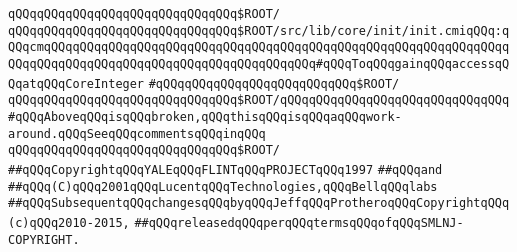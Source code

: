 \verb|qQQqqQQqqQQqqQQqqQQqqQQqqQQqqQQq$ROOT/|\newline
\newline
\verb|qQQqqQQqqQQqqQQqqQQqqQQqqQQqqQQq$ROOT/src/lib/core/init/init.cmiqQQq:qQQqcmqQQqqQQqqQQqqQQqqQQqqQQqqQQqqQQqqQQqqQQqqQQqqQQqqQQqqQQqqQQqqQQqqQQqqQQqqQQqqQQqqQQqqQQqqQQqqQQqqQQqqQQqqQQq#qQQqToqQQqgainqQQqaccessqQQqatqQQqCoreInteger|\newline
\newline
\verb|#qQQqqQQqqQQqqQQqqQQqqQQqqQQq$ROOT/|\newline
\verb|qQQqqQQqqQQqqQQqqQQqqQQqqQQqqQQq$ROOT/|\verb|qQQqqQQqqQQqqQQqqQQqqQQqqQQqqQQq#qQQqAboveqQQqisqQQqbroken,qQQqthisqQQqisqQQqaqQQqwork-around.qQQqSeeqQQqcommentsqQQqinqQQq|\newline
\newline
\verb|qQQqqQQqqQQqqQQqqQQqqQQqqQQqqQQq$ROOT/|\newline
\newline
\newline
\verb|##qQQqCopyrightqQQqYALEqQQqFLINTqQQqPROJECTqQQq1997|\newline
\verb|##qQQqand|\newline
\verb|##qQQq(C)qQQq2001qQQqLucentqQQqTechnologies,qQQqBellqQQqlabs|\newline
\verb|##qQQqSubsequentqQQqchangesqQQqbyqQQqJeffqQQqProtheroqQQqCopyrightqQQq(c)qQQq2010-2015,|\newline
\verb|##qQQqreleasedqQQqperqQQqtermsqQQqofqQQqSMLNJ-COPYRIGHT.|\newline

